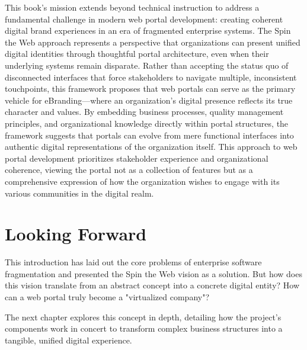This book's mission extends beyond technical instruction to address a fundamental challenge in modern web portal development: creating coherent digital brand experiences in an era of fragmented enterprise systems. The Spin the Web approach represents a perspective that organizations can present unified digital identities through thoughtful portal architecture, even when their underlying systems remain disparate. Rather than accepting the status quo of disconnected interfaces that force stakeholders to navigate multiple, inconsistent touchpoints, this framework proposes that web portals can serve as the primary vehicle for eBranding—where an organization's digital presence reflects its true character and values. By embedding business processes, quality management principles, and organizational knowledge directly within portal structures, the framework suggests that portals can evolve from mere functional interfaces into authentic digital representations of the organization itself. This approach to web portal development prioritizes stakeholder experience and organizational coherence, viewing the portal not as a collection of features but as a comprehensive expression of how the organization wishes to engage with its various communities in the digital realm.

\section{Looking Forward}
\label{sec:looking-forward}

This introduction has laid out the core problems of enterprise software fragmentation and presented the Spin the Web vision as a solution. But how does this vision translate from an abstract concept into a concrete digital entity? How can a web portal truly become a "virtualized company"?

The next chapter explores this concept in depth, detailing how the project's components work in concert to transform complex business structures into a tangible, unified digital experience.
